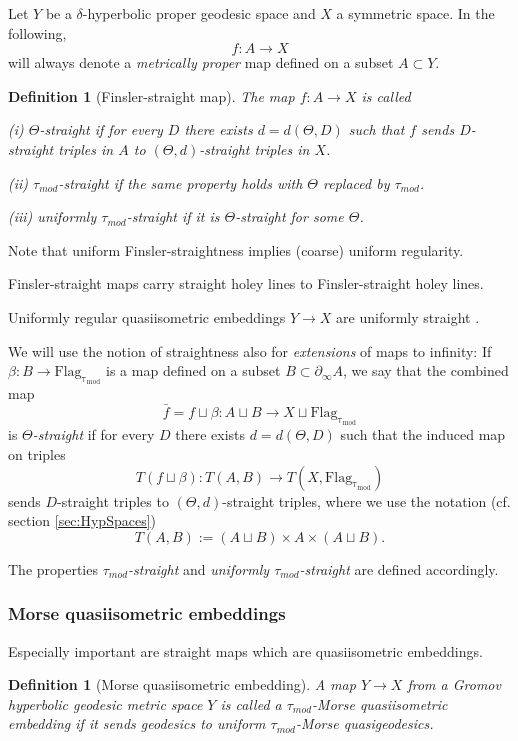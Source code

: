 \documentclass[12pt]{article}
\theoremstyle{boldplain}
\theoremstyle{bolddefinition}
\newtheorem{dfn}[equation]{Definition}
\newtheorem{definition}[equation]{Definition}
\numberwithin{equation}{section}
\def\de{\delta}
\def\Flagt{\operatorname{Flag_{\tau_{mod}}}}
\def\geo{\partial_{\infty}}
\def\taumod{\tau_{mod}}
\begin{document}
Let $Y$ be a $\de$-hyperbolic proper geodesic space
and $X$ a symmetric space. 
In the following, $$f:A\to X$$ will always denote a {\em metrically proper} map defined on a subset $A\subset Y$.

\begin{dfn}
[Finsler-straight map]
\label{dfn:fstrghtmp}
The map $f:A\to X$ is called 

(i) {\em $\Theta$-straight} if for every $D$ there exists $d=d(\Theta,D)$ 
such that $f$ sends $D$-straight triples in $A$ to $(\Theta,d)$-straight triples in $X$. 

(ii) {\em $\taumod$-straight} if the same property holds with $\Theta$ replaced by $\taumod$.

(iii) {\em uniformly $\taumod$-straight} 
if it is $\Theta$-straight for some $\Theta$.
\end{dfn}

Note that uniform Finsler-straightness implies (coarse) uniform regularity. 

Finsler-straight maps carry straight holey lines to Finsler-straight holey lines.

Uniformly regular quasiisometric embeddings $Y\to X$ are uniformly straight \cite{mlem}.


\medskip
We will use the notion of straightness also for {\em extensions} of maps to infinity: 
If $\beta:B\to\Flagt$ is a map defined on a subset $B\subset\geo A$, 
we say that the 
combined 
map 
$$\bar f=f\sqcup\beta:A\sqcup B\to X\sqcup\Flagt $$
is {\em $\Theta$-straight} if 
for every $D$ there exists $d=d(\Theta,D)$ 
such that the induced map on triples 
$$ T(f\sqcup\beta) : T(A,B)\to T(X,\Flagt) $$
sends $D$-straight triples to $(\Theta,d)$-straight triples,
where we use the notation (cf. section \ref{sec:HypSpaces})  
$$T(A,B):=(A\sqcup B)\times A\times(A\sqcup B).$$

The properties 
{\em $\taumod$-straight} and {\em uniformly $\taumod$-straight} are defined accordingly.


\subsubsection{Morse quasiisometric embeddings}

Especially important are straight maps which are quasiisometric embeddings.

\begin{definition}[Morse quasiisometric embedding]\label{defn:Morse-embedding}
A map $Y\to X$ from a Gromov hyperbolic geodesic metric space $Y$ is called a {\em $\taumod$-Morse quasiisometric embedding}
if it sends geodesics to uniform $\taumod$-Morse quasigeodesics. 
\end{definition}
\end{document}
